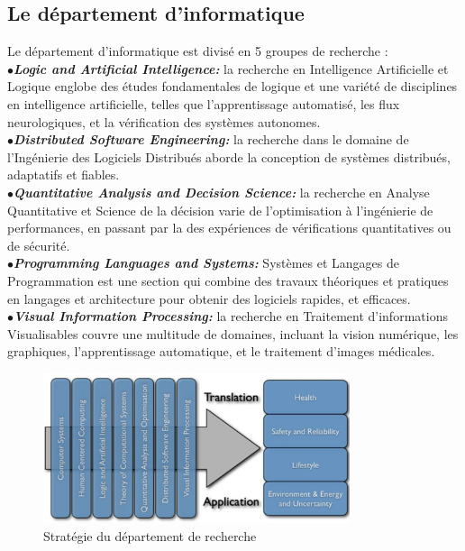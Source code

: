\documentclass[10pt]{report}
\begin{document}
	\subsection{Le département d'informatique}
	
	Le département d'informatique est divisé en 5 groupes de recherche : 
	\\{$\bullet$}\textit{\textbf{Logic and Artificial Intelligence:}} la recherche en Intelligence Artificielle et Logique englobe des études fondamentales de logique et une variété de disciplines en intelligence artificielle, telles que l'apprentissage automatisé, les flux neurologiques, et la vérification des systèmes autonomes.
	\\{$\bullet$}\textit{\textbf{Distributed Software Engineering:}} la recherche dans le domaine de l'Ingénierie des Logiciels Distribués aborde la conception de systèmes distribués, adaptatifs et fiables.
	\\{$\bullet$}\textit{\textbf{Quantitative Analysis and Decision Science:}} la recherche en Analyse Quantitative et Science de la décision varie de l'optimisation à l'ingénierie de performances, en passant par la des expériences de vérifications quantitatives ou de sécurité.
	\\{$\bullet$}\textit{\textbf{Programming Languages and Systems:}} Systèmes et Langages de Programmation est une section qui combine des travaux théoriques et pratiques en langages et architecture pour obtenir des logiciels rapides, et efficaces.
	\\{$\bullet$}\textit{\textbf{Visual Information Processing:}} la recherche en Traitement d'informations Visualisables couvre une multitude de domaines, incluant la vision numérique, les graphiques, l'apprentissage automatique, et le traitement d'images médicales.
	
	\begin{figure}
		\includegraphics[width=9cm]{Reports/figures/research_strategy.jpg}
		\caption{Stratégie du département de recherche}
		\label{Stratégie du département de recherche}
	\end{figure}~\par
	
\end{document}

